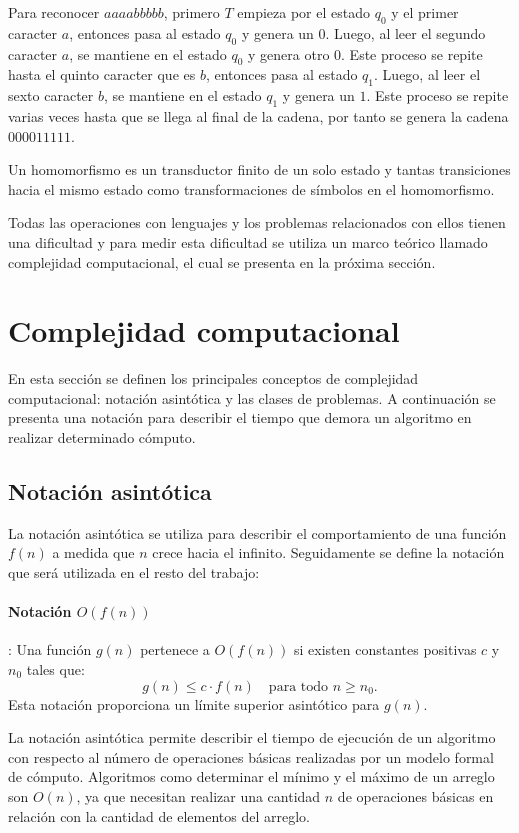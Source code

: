 Para reconocer $aaaabbbbb$, primero $T$ empieza por el estado $q_0$ y el primer caracter $a$, entonces pasa al estado $q_0$ y genera un $0$.
Luego, al leer el segundo caracter $a$, se mantiene en el estado $q_0$ y genera otro $0$. Este proceso se repite hasta el quinto caracter
que es $b$, entonces pasa al estado $q_1$. Luego, al leer el sexto caracter $b$, se mantiene en el estado $q_1$ y genera un $1$. Este proceso
se repite varias veces hasta que se llega al final de la cadena, por tanto se genera la cadena $000011111$.

Un homomorfismo es un transductor finito de un solo estado y tantas transiciones hacia el mismo estado como transformaciones de símbolos en el homomorfismo.


Todas las operaciones con lenguajes y los problemas relacionados con ellos tienen una dificultad y para medir esta dificultad
se utiliza un marco teórico llamado complejidad computacional, el cual se presenta en la próxima sección.

\section{Complejidad computacional}

En esta sección se definen los principales conceptos de complejidad computacional: notación asintótica y las clases de problemas. A continuación se presenta una notación para describir el tiempo que demora un algoritmo en realizar determinado cómputo.

\subsection{Notación asintótica}

La notación asintótica se utiliza para describir el comportamiento de una función $f(n)$ a medida que $n$ crece hacia el infinito.  Seguidamente se define la notación que será utilizada en el resto del trabajo:

\paragraph{Notación $O(f(n))$}: Una función $g(n)$ pertenece a $O(f(n))$ si existen constantes positivas $c$ y $n_0$ tales que:
\[
  g(n) \leq c \cdot f(n) \quad \text{para todo } n \geq n_0.
\]
Esta notación proporciona un límite superior asintótico para $g(n)$.

La notación asintótica permite describir el tiempo de ejecución de un algoritmo con respecto al número de 
operaciones básicas realizadas por un modelo formal de cómputo.  Algoritmos como determinar el mínimo y el 
máximo de un arreglo son $O(n)$, ya que necesitan realizar una cantidad $n$ de operaciones básicas en relación 
con la cantidad de elementos del arreglo.

